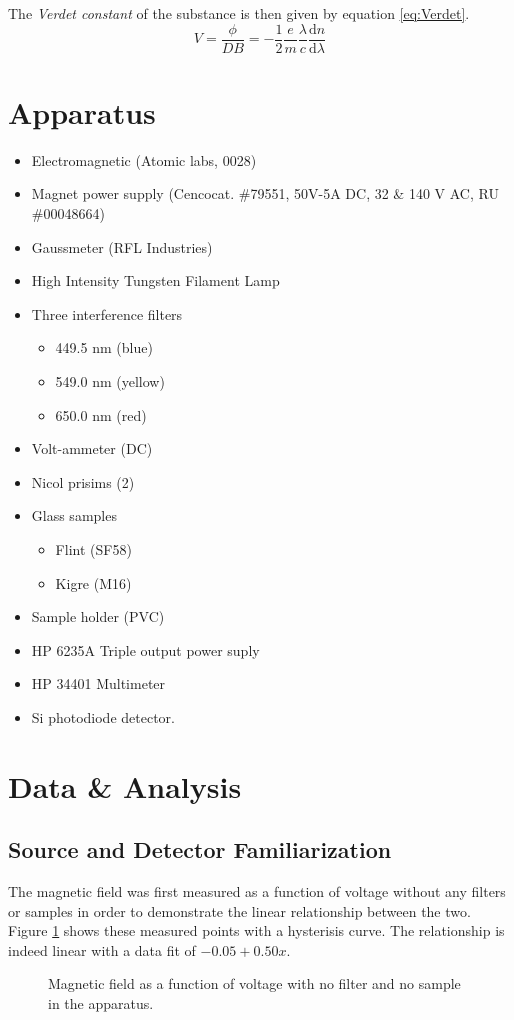 \documentclass[10pt,onecolumn]{article} %
\begin{document}
The {\em Verdet constant} of the substance is then given by equation \ref{eq:Verdet}.
\begin{equation}\label{eq:Verdet}
V = \frac{\phi}{D B} = -\frac{1}{2} \frac{e}{m} \frac{\lambda}{c} \frac{\mathrm{d}n}{\mathrm{d} \lambda}
\end{equation}

\section{Apparatus}
\begin{itemize}
\item Electromagnetic (Atomic labs, 0028)
\item Magnet power supply (Cencocat. \#79551, 50V-5A DC, 32 \& 140 V AC, RU \#00048664)
\item Gaussmeter (RFL Industries)
\item High Intensity Tungsten Filament Lamp
\item Three interference filters
\begin{itemize}
\item 449.5 nm (blue)
\item 549.0 nm (yellow)
\item 650.0 nm (red)
\end{itemize}
\item Volt-ammeter (DC)
\item Nicol prisims (2)
\item Glass samples
\begin{itemize}
\item Flint (SF58)
\item Kigre (M16)
\end{itemize}
\item Sample holder (PVC)
\item HP 6235A Triple output power suply
\item HP 34401 Multimeter
\item Si photodiode detector.
\end{itemize}

\section{Data \& Analysis}
\subsection{Source and Detector Familiarization}
The magnetic field was first measured as a function of voltage without any filters or samples in order to demonstrate the linear relationship between the two. Figure \ref{fig:plot01-MField} shows these measured points with a hysterisis curve. The relationship is indeed linear with a data fit of $-0.05 + 0.50 x$.
\begin{figure}

\caption{Magnetic field as a function of voltage with no filter and no sample in the apparatus.}\label{fig:plot01-MField}
\end{figure}
\end{document}
